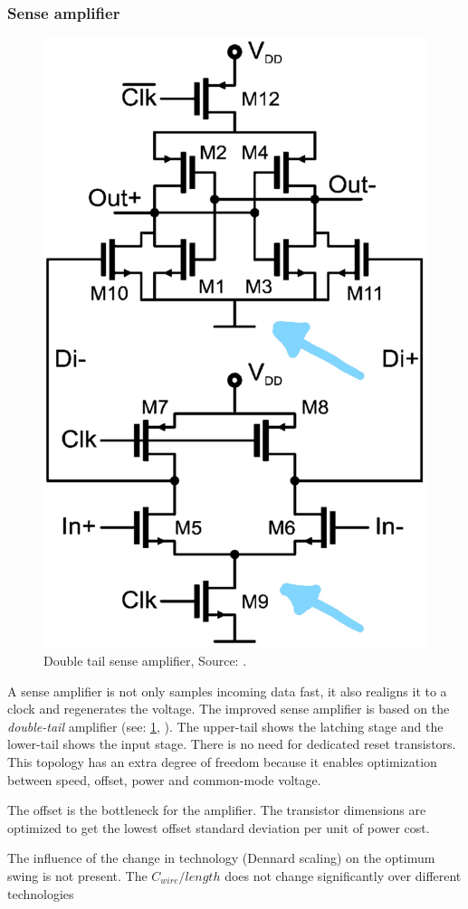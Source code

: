 \subsubsection{Sense amplifier} \label{sss:rep2:senseamp} %

\begin{figure}[]
	\centering
	\includegraphics[width=0.6\linewidth]{Figures/Rep2DoubleTail.jpg}
	\caption{Double tail sense amplifier, Source: \cite{schinkel2009low}.} 
    \label{fig:rep2:doubletail}
\end{figure}

A sense amplifier is not only samples incoming data fast, it also realigns it to a clock and regenerates the voltage.
The improved sense amplifier is based on the \textit{double-tail} amplifier (see: \cref{fig:rep2:doubletail}, \cite{schinkel2007double}).
The upper-tail shows the latching stage and the lower-tail shows the input stage.
There is no need for dedicated reset transistors.
This topology has an extra degree of freedom because it enables optimization between speed, offset, power and common-mode voltage.

The offset is the bottleneck for the amplifier.
The transistor dimensions are optimized to get the lowest offset standard deviation per unit of power cost.

The influence of the change in technology (Dennard scaling) on the optimum swing is not present.
The $C_{wire}/length$ does not change significantly over different technologies

